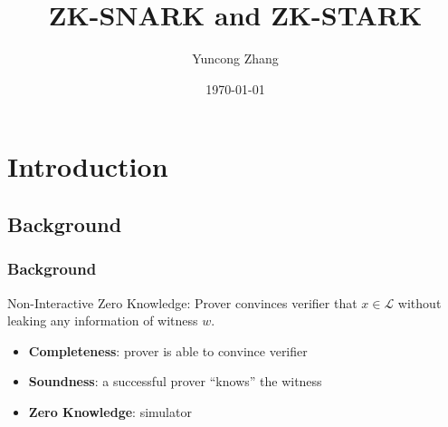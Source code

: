 \documentclass{beamer}
\title{ZK-SNARK and ZK-STARK}
\author{Yuncong Zhang}
\date{\today}
\newcommand{\calL}{\mathcal{L}}
\begin{document}
\frame{\titlepage}

\frame{\tableofcontents}

\section{Introduction}
\subsection{Background}
\frame
{
  \frametitle{Background}
  Non-Interactive Zero Knowledge: Prover convinces verifier that $x\in\calL$ without leaking any information of witness $w$.
  \begin{itemize}
    \item \textbf{Completeness}: prover is able to convince verifier
    \item \textbf{Soundness}: a successful prover ``knows'' the witness
    \item \textbf{Zero Knowledge}: simulator
  \end{itemize}
}
\end{document}
